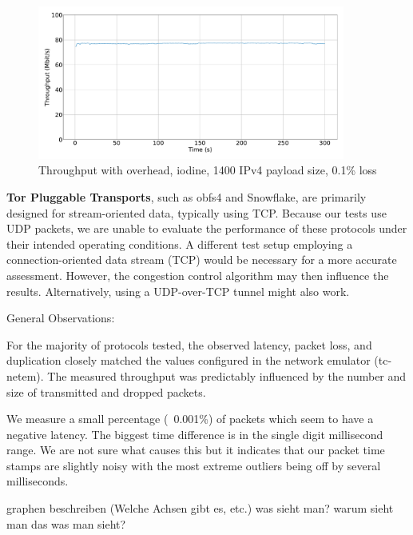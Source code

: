 \begin{figure}[tbh]
	\centering
	\includegraphics[draft=false,width=0.9\textwidth]{figures/Graphs/graph-5-iodine-constant-throughput/throughput.pdf}
	\caption{Throughput with overhead, iodine, 1400 IPv4 payload size, 0.1\% loss}
	\label{fig:graph-5-iodine-constant-throughput}
\end{figure}


\textbf{Tor Pluggable Transports}, such as obfs4 and Snowflake, are primarily designed for stream-oriented data, typically using TCP.
Because our tests use UDP packets, we are unable to evaluate the performance of these protocols under their intended operating conditions.
A different test setup employing a connection-oriented data stream (TCP) would be necessary for a more accurate assessment.
However, the congestion control algorithm may then influence the results.
Alternatively, using a UDP-over-TCP tunnel might also work.


General Observations:

For the majority of protocols tested, the observed latency, packet loss, and duplication closely matched the values configured in the network emulator (tc-netem).
The measured throughput was predictably influenced by the number and size of transmitted and dropped packets.

We measure a small percentage (~0.001\%) of packets which seem to have a negative latency.
The biggest time difference is in the single digit millisecond range.
We are not sure what causes this but it indicates that our packet time stamps are slightly noisy with the most extreme outliers being off by several milliseconds.




graphen beschreiben (Welche Achsen gibt es, etc.)
was sieht man?
warum sieht man das was man sieht?

